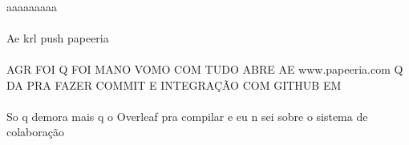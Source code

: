 \documentclass[12pt]{article}
\begin{document}
\paragraph{}aaaaaaaaa
\paragraph{}Ae krl push papeeria
\paragraph{}AGR FOI Q FOI MANO VOMO COM TUDO ABRE AE www.papeeria.com Q DA PRA FAZER COMMIT E INTEGRAÇÃO COM GITHUB EM
\paragraph{}So q demora mais q o Overleaf pra compilar e eu n sei sobre o sistema de colaboração
\end{document}
